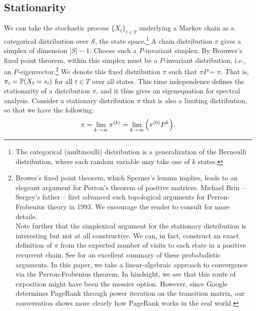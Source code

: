 \documentclass[../exploring-pagerank.tex]{subfiles}
\begin{document}
    \subsection{Stationarity}
    We can take the stochastic process $\{X_t\}_{t \in T}$ underlying a Markov chain as a categorical distribution over $\mathcal{S}$, the state space.\footnote{The categorical (multinoulli) distribution is a generalization of the Bernoulli distribution, where each random variable may take one of $k$ states.} A chain distribution $\pi$ gives a simplex of dimension $|S| - 1$. Choose such a $P$-invariant simplex. By Brouwer's fixed point theorem, within this simplex must be a $P$-invariant distribution, i.e., an $P$-eigenvector.\footnote{Brower's fixed point theorem, which Sperner's lemma implies, leads to an elegeant argument for Perron's theorem of positive matrices. Michael Brin -- Sergey's father -- first advanced such topological arguments for Perron-Frobenius theory in 1993. We encourage the reader to consult \cite{boyleBasicPerronFrobeniusTheory} for more details. \vspace{0.5em} \\  Note further that the simplexical argument for the stationary distribution is interesting but not at all constructive. We can, in fact, construct an exact definition of $\pi$ from the expected number of visits to each state in a positive recurrent chain. See \cite{freedmanConvergenceTheoremFinite} for an excellent summary of these probabalistic arguments. In this paper, we take a linear-algebraic approach to convergence via the Perron-Frobenius theorem. In hindsight, we see that this route of exposition might have been the messier option. However, since Google determines PageRank through power iteration on the transition matrix, our conversation shows more clearly how PageRank works in the real world.} We denote this fixed distribution $\pi$ such that $\pi P = \pi$. That is, $\pi_i = \mathbb{P}(X_t = s_i)$ for all $t\in T$ over all states. This time independence defines the stationarity of a distribution $\pi$, and it thus gives an eigenequation for spectral analysis. Consider a stationary distribution $\pi$ that is also a limiting distribution, so that we have the following:
	\begin{equation*}
		\pi = \lim_{k\to\infty}{{\pi^{(k)}}} = \lim_{k\to\infty}{\left( {\pi^{(0)}} P^k \right)}.
	\end{equation*}
\end{document}
